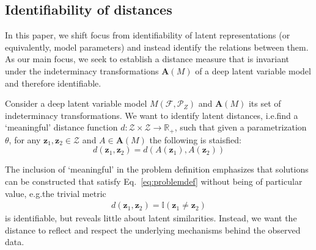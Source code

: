 
\subsection{Identifiability of distances}
In this paper, we shift focus from identifiability of latent representations (or equivalently, model parameters) and instead identify the relations between them. As our main focus, we seek to establish a distance measure that is invariant under the indeterminacy transformations $\mathbf{A}(M)$ of a deep latent variable model and therefore identifiable. 
\begin{problem}
\label{problem}
Consider a deep latent variable model $M(\mathcal{F}, \mathcal{P}_Z)$ and $\mathbf{A}(M)$ its set of indeterminacy transformations. We want to identify latent distances, i.e.\@ find a `meaningful' distance function $d: \mathcal{Z}\times \mathcal{Z} \rightarrow \mathbb{R}_+$, such that given a parametrization $\theta$, for any $\mathbf{z}_1, \mathbf{z}_2 \in \mathcal{Z}$ and $A \in \mathbf{A}(M)$ the following is staisfied:
\begin{equation}
\label{eq:problemdef}
    d(\mathbf{z}_1,\mathbf{z}_2) = d(A(\mathbf{z}_1), A(\mathbf{z}_2))
\end{equation}
\end{problem}

The inclusion of `meaningful' in the problem definition emphasizes that solutions can be constructed that satisfy Eq.~\ref{eq:problemdef} without being of particular value, e.g.\@ the trivial metric
\begin{align}
  d(\mathbf{z}_1,\mathbf{z}_2) = \mathbb{I}(\mathbf{z}_1 \neq \mathbf{z}_2)
\end{align}
is identifiable, but reveals little about latent similarities.
Instead, we want the distance to reflect and respect the underlying mechanisms behind the observed data. 